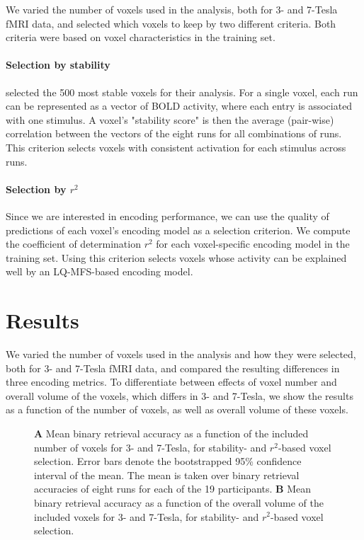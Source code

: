 We varied the number of voxels used in the analysis, both for 3- and 7-Tesla f{MRI} data,
and selected which voxels to keep by two different criteria. Both criteria were
based on voxel characteristics in the training set.  

\paragraph{Selection by stability}

\citet{ML08} selected the 500 most stable voxels for their analysis. For a
single voxel, each run can be represented as a vector of BOLD activity, where each
entry is associated with one stimulus. A voxel's "stability score" is then the
average (pair-wise) correlation between the vectors of the eight runs for all
combinations of runs.
This criterion selects voxels with consistent activation for each stimulus across runs.

\paragraph{Selection by $r^2$}

Since we are interested in encoding performance, we can use the quality of
predictions of each voxel's encoding model as a selection criterion. We compute
the coefficient of determination $r^2$ for each voxel-specific encoding model in
the training set. Using this criterion selects voxels whose activity can be explained well
by an LQ-MFS-based encoding model.

\section*{Results}

We varied the number of voxels used in the analysis and how they were selected,
both for 3- and 7-Tesla f{MRI} data, and compared the resulting differences in
three encoding metrics. To differentiate between effects of voxel number and
overall volume of the voxels, which differs in 3- and 7-Tesla, we show the results as a function of the number of voxels, as well as overall volume of
these voxels.

\begin{figure}
  \centering
  \def\svgwidth{\linewidth}
  
	
  \caption{\textbf{A} Mean binary retrieval accuracy as a function of the included number of
  voxels for 3- and 7-Tesla, for stability- and $r^2$-based voxel selection. Error bars denote the bootstrapped 95\% confidence
  interval of the mean. The mean is taken over binary retrieval accuracies of
  eight runs for each of the 19 participants. \textbf{B} Mean binary retrieval accuracy as a function of the overall volume of
	  the included voxels for 3- and 7-Tesla, for stability- and $r^2$-based voxel selection.}

 \label{fig:binary_retrieval}
\end{figure}

